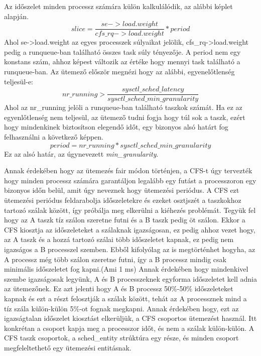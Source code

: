 Az időszelet minden processz számára külön kalkulálódik, az alábbi képlet alapján.
\begin{equation}
slice = \frac{se->load.weight}{cfs\_rq->load.weight}*period
\end{equation}
Ahol se->load.weight az egyes processzek súlyaikat jelölik, cfs\_rq->load.weight pedig a runqueue-ban található összes task súly tényezője. A period nem egy konstans szám, ahhoz képest változik az értéke hogy mennyi task található a runqueue-ban. 
Az ütemező először megnézi hogy az alábbi, egyenelőtlenség teljesül-e:
\begin{equation}
nr\_running > \frac{sysctl\_sched\_latency}{sysctl\_sched\_min\_granularity}
\end{equation}
Ahol az nr\_running jelöli a runqueue-ban található taszkok számát. Ha ez az egyenlőtlenség nem teljesül, az ütemező tudni fogja hogy túl sok a taszk, ezért hogy mindenkinek biztosítson elegendő időt, egy bizonyos alsó határt fog felhasználni a következő képpen.
\begin{equation}
period =  nr\_running * sysctl\_sched\_min\_granularity
\end{equation}
Ez az alsó határ, az úgynevezett \textit{min\_granularity}.



Annak érdekében hogy az ütemezés fair módon történjen, a CFS-t úgy tervezték hogy minden processz számára garantáljon legalább egy futást a processzoron egy bizonyos időn belül, amit úgy neveznek hogy ütemezési periódus.
A CFS ezt ütemezési periódus feldarabolja időszeletekre és ezeket osztjszét a taszkokhoz tartozó szálak között, így próbálja meg elkerülni a kiéhezés problémát. 
Tegyük fel hogy az A taszk tíz szálon szeretne futni és a B taszk pedig öt szálon. Ekkor a CFS kiosztja az időszeleteket a szálaknak igazságosan, ez pedig ahhoz vezet hogy, az A taszk és a hozzá tartozó szálai több időszeletet kapnak, ez pedig nem igazságos a B processzel szemben.
Ebből kifolyólag az is megtörténhet hogyha, az A processz még több szálon szeretne futni, így a B processz mindig csak minimális időszeletet fog kapni.(Ami 1 ms) Annak érdekében hogy mindenkivel szembe igazságosak legyünk, A és B processzeknek egyforma időszeletet kell adnia az ütemezőnek. Ez azt jelenti hogy A és B processz 50\%-50\% időszeleteket kapnak és ezt a részt felosztják a szálak között, tehát az A processznek mind a tíz szála külön-külön 5\%-ot fognak megkapni.
Annak érdekében hogy, ezt az igazságtalan időszelet kiosztást elkerüljük, a CFS csoportos ütemezést használ. Itt konkrétan a csoport kapja meg a processzor időt, és nem a szálak külön-külön.
A CFS taszk csoportok, a sched\_entity strúktúra egy része, és minden csoport megfeleltethető egy ütemezési entitásnak.

